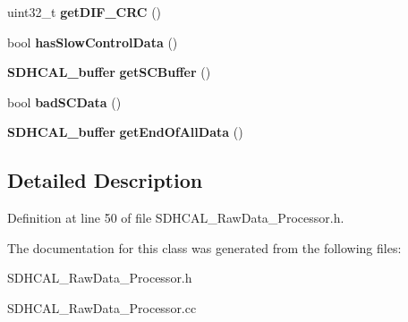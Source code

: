\begin{DoxyCompactItemize}
\item 
uint32\-\_\-t {\bfseries get\-D\-I\-F\-\_\-\-C\-R\-C} ()\label{classSDHCAL__RawBuffer__Navigator_ad85f281c4cd8205179b6b0639eb36f21}

\item 
bool {\bfseries has\-Slow\-Control\-Data} ()\label{classSDHCAL__RawBuffer__Navigator_a3fa2456e044884b3f30b894a28210065}

\item 
{\bf S\-D\-H\-C\-A\-L\-\_\-buffer} {\bfseries get\-S\-C\-Buffer} ()\label{classSDHCAL__RawBuffer__Navigator_adce9a434b3626a15646254b38b3004a9}

\item 
bool {\bfseries bad\-S\-C\-Data} ()\label{classSDHCAL__RawBuffer__Navigator_af39905619e2c3f989ad51a3a58c096fa}

\item 
{\bf S\-D\-H\-C\-A\-L\-\_\-buffer} {\bfseries get\-End\-Of\-All\-Data} ()\label{classSDHCAL__RawBuffer__Navigator_aef4e7e1e81e73588507c10bdc3c918a4}

\end{DoxyCompactItemize}


\subsection{Detailed Description}


Definition at line 50 of file S\-D\-H\-C\-A\-L\-\_\-\-Raw\-Data\-\_\-\-Processor.\-h.



The documentation for this class was generated from the following files\-:\begin{DoxyCompactItemize}
\item 
S\-D\-H\-C\-A\-L\-\_\-\-Raw\-Data\-\_\-\-Processor.\-h\item 
S\-D\-H\-C\-A\-L\-\_\-\-Raw\-Data\-\_\-\-Processor.\-cc\end{DoxyCompactItemize}
